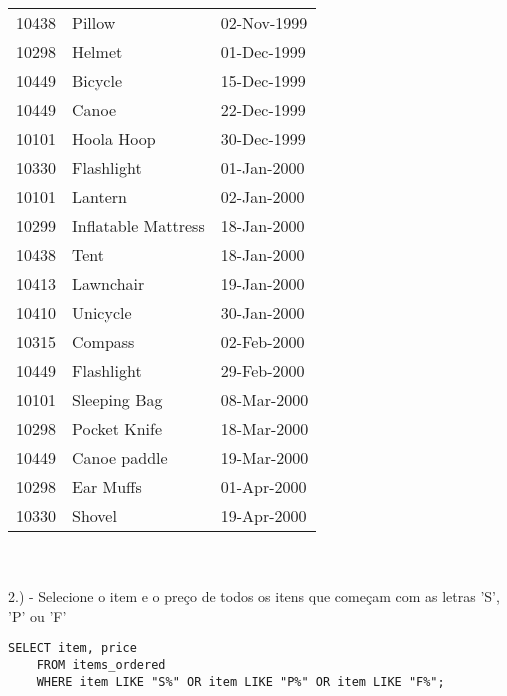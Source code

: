 \begin{tabular}{lll}
    {10438}               & {Pillow}              & {02-Nov-1999}          \\
    {10298}               & {Helmet}              & {01-Dec-1999}          \\
    {10449}               & {Bicycle}             & {15-Dec-1999}          \\
    {10449}               & {Canoe}               & {22-Dec-1999}          \\
    {10101}               & {Hoola Hoop}          & {30-Dec-1999}          \\
    {10330}               & {Flashlight}          & {01-Jan-2000}          \\
    {10101}               & {Lantern}             & {02-Jan-2000}          \\
    {10299}               & {Inflatable Mattress} & {18-Jan-2000}          \\
    {10438}               & {Tent}                & {18-Jan-2000}          \\
    {10413}               & {Lawnchair}           & {19-Jan-2000}          \\
    {10410}               & {Unicycle}            & {30-Jan-2000}          \\
    {10315}               & {Compass}             & {02-Feb-2000}          \\
    {10449}               & {Flashlight}          & {29-Feb-2000}          \\
    {10101}               & {Sleeping Bag}        & {08-Mar-2000}          \\
    {10298}               & {Pocket Knife}        & {18-Mar-2000}          \\
    {10449}               & {Canoe paddle}        & {19-Mar-2000}          \\
    {10298}               & {Ear Muffs}           & {01-Apr-2000}          \\
    {10330}               & {Shovel}              & {19-Apr-2000}         
\end{tabular} \\ \\


2.) - Selecione o item e o preço de todos os itens que começam com as letras 'S', 'P' ou 'F'

\begin{lstlisting}
SELECT item, price
	FROM items_ordered
	WHERE item LIKE "S%" OR item LIKE "P%" OR item LIKE "F%";
\end{lstlisting}

